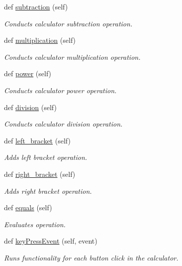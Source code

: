 \begin{DoxyCompactItemize}
def \hyperlink{classmain_1_1_main_window_a11dbd9c961cc33a4fe1bb87226810bca}{subtraction} (self)
\begin{DoxyCompactList}\small\item\em Conducts calculator subtraction operation. \end{DoxyCompactList}\item 
def \hyperlink{classmain_1_1_main_window_ac01c5ab4257a8aac093821c829ebbcd2}{multiplication} (self)
\begin{DoxyCompactList}\small\item\em Conducts calculator multiplication operation. \end{DoxyCompactList}\item 
def \hyperlink{classmain_1_1_main_window_a477f4d4d5bb5ef2805a250a36745ab4b}{power} (self)
\begin{DoxyCompactList}\small\item\em Conducts calculator power operation. \end{DoxyCompactList}\item 
def \hyperlink{classmain_1_1_main_window_a74162ce8832ff39d12773e129aaca8fb}{division} (self)
\begin{DoxyCompactList}\small\item\em Conducts calculator division operation. \end{DoxyCompactList}\item 
def \hyperlink{classmain_1_1_main_window_a2e0fc10335f0a466d3681cb2ca47d72c}{left\+\_\+bracket} (self)
\begin{DoxyCompactList}\small\item\em Adds left bracket operation. \end{DoxyCompactList}\item 
def \hyperlink{classmain_1_1_main_window_a5685744d7001c36a299b5e7ce984cf92}{right\+\_\+bracket} (self)
\begin{DoxyCompactList}\small\item\em Adds right bracket operation. \end{DoxyCompactList}\item 
def \hyperlink{classmain_1_1_main_window_a153d3cd5e2476e7f262d67600c77c1fc}{equals} (self)
\begin{DoxyCompactList}\small\item\em Evaluates operation. \end{DoxyCompactList}\item 
def \hyperlink{classmain_1_1_main_window_a298fe7db20162628212e8f665dc098f5}{key\+Press\+Event} (self, event)
\begin{DoxyCompactList}\small\item\em Runs functionality for each button click in the calculator. \end{DoxyCompactList}\end{DoxyCompactItemize}
